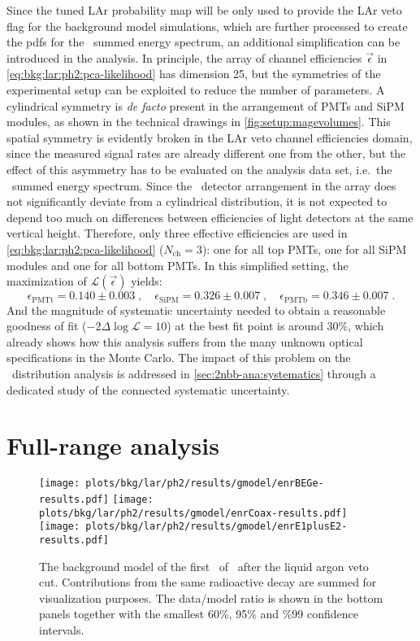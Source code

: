 Since the tuned LAr probability map will be only used to provide the LAr veto flag for the
background model simulations, which are further processed to create the pdfs for the
\bege\ summed energy spectrum, an additional simplification can be introduced in the
analysis. In principle, the array of channel efficiencies $\vec{\epsilon}$ in
\cref{eq:bkg:lar:ph2:pca-likelihood} has dimension 25, but the symmetries of the
experimental setup can be exploited to reduce the number of parameters. A cylindrical
symmetry is \emph{de facto} present in the arrangement of PMTs and SiPM modules, as shown
in the technical drawings in \cref{fig:setup:magevolumes}. This spatial symmetry is evidently
broken in the LAr veto channel efficiencies domain, since the measured signal rates are
already different one from the other, but the effect of this asymmetry has to be evaluated
on the analysis data set, i.e.~the \bege\ summed energy spectrum. Since the \bege\
detector arrangement in the array does not significantly deviate from a cylindrical
distribution, it is not expected to depend too much on differences between efficiencies of
light detectors at the same vertical height. Therefore, only three effective efficiencies
are used in \cref{eq:bkg:lar:ph2:pca-likelihood} ($N_\text{ch}=3$): one for all top PMTs,
one for all SiPM modules and one for all bottom PMTs.
\newpar
In this simplified setting, the maximization of $\mathcal{L}(\vec{\epsilon})$ yields:
\[
  \epsilon_\text{PMTt} = 0.140 \pm 0.003 \;, \quad
  \epsilon_\text{SiPM} = 0.326 \pm 0.007 \;, \quad
  \epsilon_\text{PMTb} = 0.346 \pm 0.007 \;.
\]
And the magnitude of systematic uncertainty needed to obtain a reasonable goodness of fit
($-2\Delta\log\mathcal{L}=10$) at the best fit point is around 30\%, which already shows
how this analysis suffers from the many unknown optical specifications in the Monte Carlo.
The impact of this problem on the \nnbb\ distribution analysis is addressed in
\cref{sec:2nbb-ana:systematics} through a dedicated study of the connected systematic
uncertainty.

\section{Full-range analysis}%
\label{sec:bkg:lar:ph2:gmodel}

\begin{figure}
  \centering
  \texttt{[image: plots/bkg/lar/ph2/results/gmodel/enrBEGe-results.pdf]}
  \texttt{[image: plots/bkg/lar/ph2/results/gmodel/enrCoax-results.pdf]}
  \texttt{[image: plots/bkg/lar/ph2/results/gmodel/enrE1plusE2-results.pdf]}
  \caption{%
    The background model of the first \gexpophasetwobkg\ of \gerdatwo\ after the liquid argon veto
    cut. Contributions from the same radioactive decay are summed for visualization
    purposes. The data/model ratio is shown in the bottom panels together with the
    smallest 60\%, 95\% and \%99 confidence intervals.
  }\label{fig:bkg:lar:ph2:results}
\end{figure}


